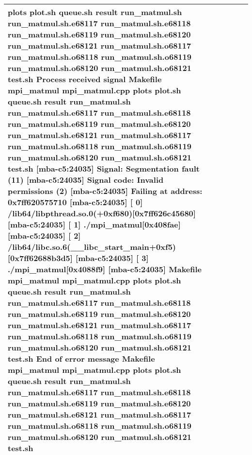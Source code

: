 \documentclass{article}
\begin{document}
\begin{tabular} { | l | l | l | l | l | l | }
plots plot.sh queue.sh result run_matmul.sh run_matmul.sh.e68117 run_matmul.sh.e68118 run_matmul.sh.e68119 run_matmul.sh.e68120 run_matmul.sh.e68121 run_matmul.sh.o68117 run_matmul.sh.o68118 run_matmul.sh.o68119 run_matmul.sh.o68120 run_matmul.sh.o68121 test.sh Process received signal Makefile mpi_matmul mpi_matmul.cpp plots plot.sh queue.sh result run_matmul.sh run_matmul.sh.e68117 run_matmul.sh.e68118 run_matmul.sh.e68119 run_matmul.sh.e68120 run_matmul.sh.e68121 run_matmul.sh.o68117 run_matmul.sh.o68118 run_matmul.sh.o68119 run_matmul.sh.o68120 run_matmul.sh.o68121 test.sh [mba-c5:24035] Signal: Segmentation fault (11) [mba-c5:24035] Signal code: Invalid permissions (2) [mba-c5:24035] Failing at address: 0x7ff620575710 [mba-c5:24035] [ 0] /lib64/libpthread.so.0(+0xf680)[0x7ff626c45680] [mba-c5:24035] [ 1] ./mpi_matmul[0x408fae] [mba-c5:24035] [ 2] /lib64/libc.so.6(__libc_start_main+0xf5)[0x7ff62688b3d5] [mba-c5:24035] [ 3] ./mpi_matmul[0x4088f9] [mba-c5:24035] Makefile mpi_matmul mpi_matmul.cpp plots plot.sh queue.sh result run_matmul.sh run_matmul.sh.e68117 run_matmul.sh.e68118 run_matmul.sh.e68119 run_matmul.sh.e68120 run_matmul.sh.e68121 run_matmul.sh.o68117 run_matmul.sh.o68118 run_matmul.sh.o68119 run_matmul.sh.o68120 run_matmul.sh.o68121 test.sh End of error message Makefile mpi_matmul mpi_matmul.cpp plots plot.sh queue.sh result run_matmul.sh run_matmul.sh.e68117 run_matmul.sh.e68118 run_matmul.sh.e68119 run_matmul.sh.e68120 run_matmul.sh.e68121 run_matmul.sh.o68117 run_matmul.sh.o68118 run_matmul.sh.o68119 run_matmul.sh.o68120 run_matmul.sh.o68121 test.sh \\ \hline

\end{tabular}
\end{document}
